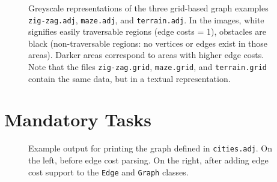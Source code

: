 \documentclass[a4paper,10pt]{article}
\begin{document}
\begin{figure}
  \centering
  \hfill
  \hfill
  \caption{
    Greyscale representations of the three grid-based graph examples \texttt{zig-zag.adj}, \texttt{maze.adj}, and \texttt{terrain.adj}.
    In the images, white signifies easily traversable regions (edge costs = 1), obstacles are black (non-traversable regions: no vertices or edges exist in those areas).
    Darker areas correspond to areas with higher edge costs.
    Note that the files \texttt{zig-zag.grid}, \texttt{maze.grid}, and \texttt{terrain.grid} contain the same data, but in a textual representation.
  }\label{fig:grid-examples}
\end{figure}



\section{Mandatory Tasks}

\begin{figure}
  \centering
  \hfill
  \caption{
    Example output for printing the graph defined in \texttt{cities.adj}.
    On the left, before edge cost parsing.
    On the right, after adding edge cost support to the \texttt{Edge} and \texttt{Graph} classes.
  }\label{fig:graph-dump-example}
\end{figure}
\end{document}
